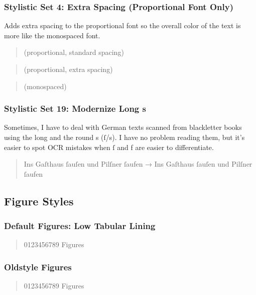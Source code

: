 \subsubsection{Stylistic Set 4: Extra Spacing (Proportional Font Only)}

Adds extra spacing to the proportional font so the overall color of the text is more like the monospaced font.

\begin{quote}\raggedright
{\setmainfont{SudoUIVariable.ttf} \sample{} (proportional, standard spacing)}
\end{quote}
\begin{quote}\raggedright
{\setmainfont{SudoUIVariable.ttf}  \sample{} (proportional, extra spacing)}
\end{quote}
\begin{quote}\raggedright
{ \sample{} (monospaced)}
\end{quote}

\subsubsection{Stylistic Set 19: Modernize Long s}

Sometimes, I have to deal with German texts scanned from blackletter books using the long and the round s (ſ/s). I have no problem reading them, but it’s easier to spot OCR mistakes when ſ and f are easier to differentiate.

\begin{quote}
Ins Gaſthaus ſauſen und Pilſner ſaufen → { Ins Gaſthaus ſauſen und Pilſner ſaufen}
\end{quote}

\subsection{Figure Styles}

\subsubsection{Default Figures: Low Tabular Lining}

\begin{quote}
0123456789 Figures
\end{quote}

\subsubsection{Oldstyle Figures}
\begin{quote}
{ 0123456789 Figures}
\end{quote}

